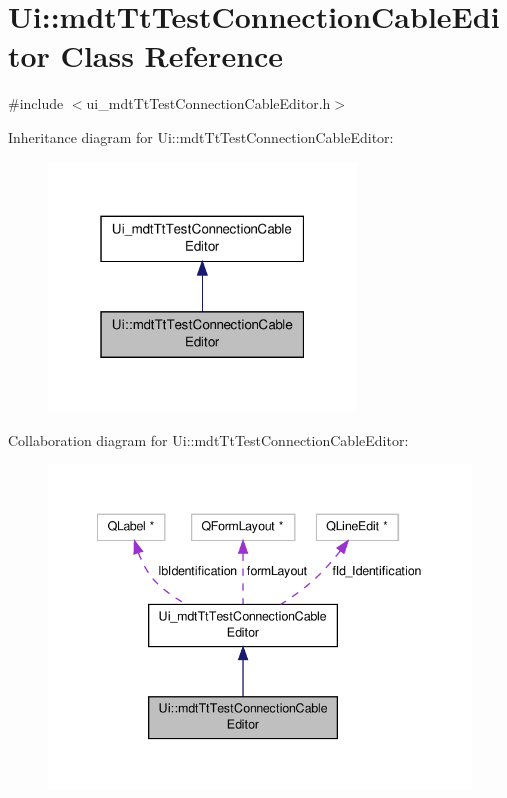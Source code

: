 \hypertarget{class_ui_1_1mdt_tt_test_connection_cable_editor}{\section{Ui\-:\-:mdt\-Tt\-Test\-Connection\-Cable\-Editor Class Reference}
\label{class_ui_1_1mdt_tt_test_connection_cable_editor}
}


{\ttfamily \#include $<$ui\-\_\-mdt\-Tt\-Test\-Connection\-Cable\-Editor.\-h$>$}



Inheritance diagram for Ui\-:\-:mdt\-Tt\-Test\-Connection\-Cable\-Editor\-:
\nopagebreak
\begin{figure}[H]
\begin{center}
\leavevmode
\includegraphics[width=232pt]{class_ui_1_1mdt_tt_test_connection_cable_editor__inherit__graph}
\end{center}
\end{figure}


Collaboration diagram for Ui\-:\-:mdt\-Tt\-Test\-Connection\-Cable\-Editor\-:
\nopagebreak
\begin{figure}[H]
\begin{center}
\leavevmode
\includegraphics[width=341pt]{class_ui_1_1mdt_tt_test_connection_cable_editor__coll__graph}
\end{center}
\end{figure}
